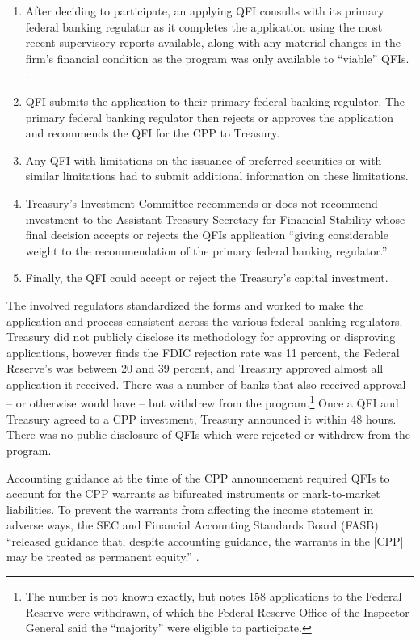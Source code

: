 \documentclass[12pt]{article}
\begin{document}
\begin{enumerate}
\item After deciding to participate, an applying QFI consults with its primary federal banking regulator as it completes the application using the most recent supervisory reports available, along with any material changes in the firm's financial condition as the program was only available to ``viable'' QFIs. \citep{CPPFaq}. 
\item QFI submits the application to their primary federal banking regulator. The primary federal banking regulator then rejects or approves the application and recommends the QFI for the CPP to Treasury. 
\item Any QFI with limitations on the issuance of preferred securities or with similar limitations had to submit additional information on these limitations. 
\item Treasury's Investment Committee recommends or does not recommend investment to the Assistant Treasury Secretary for Financial Stability whose final decision accepts or rejects the QFIs application ``giving considerable weight to the recommendation of the primary federal banking regulator.'' 
\item Finally, the QFI could accept or reject the Treasury's capital investment.
\end{enumerate}

The involved regulators standardized the forms and worked to make the application and process consistent across the various federal banking regulators.  Treasury did not publicly disclose its methodology for approving or disproving applications, however \citet{RejectionRates} finds the FDIC rejection rate was 11 percent, the Federal Reserve's was between 20 and 39 percent, and Treasury approved almost all application it received. There was a number of banks that also received approval -- or otherwise would have -- but withdrew from the program.\footnote{The number is not known exactly, but \citet{RejectionRates} notes 158 applications to the Federal Reserve were withdrawn, of which the Federal Reserve Office of the Inspector General said the ``majority'' were eligible to participate.} Once a QFI and Treasury agreed to a CPP investment, Treasury announced it within 48 hours. There was no public disclosure of QFIs which were rejected or withdrew from the program. 

Accounting guidance at the time of the CPP announcement required QFIs to account for the CPP warrants as bifurcated instruments or mark-to-market liabilities. To prevent the warrants from affecting the income statement in adverse ways, the SEC and Financial Accounting Standards Board (FASB) ``released guidance that, despite accounting guidance, the warrants in the [CPP] may be treated as permanent equity.'' \citep{mofo}. 
\end{document}
